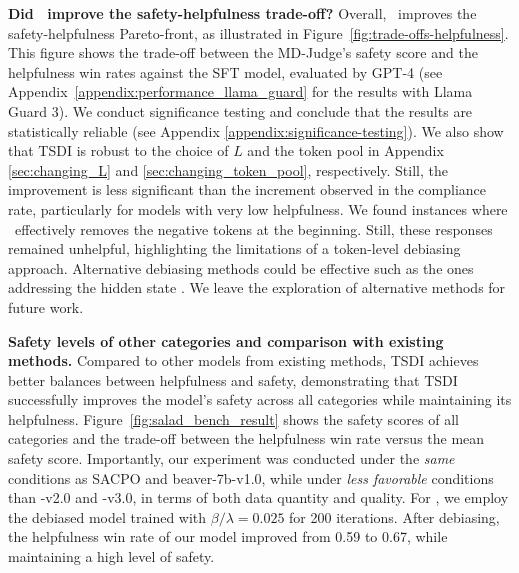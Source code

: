 \textbf{Did \algoshort~improve the safety-helpfulness trade-off?} Overall, \algoshort~improves the safety-helpfulness Pareto-front, as illustrated in Figure~\ref{fig:trade-offs-helpfulness}. This figure shows the trade-off between the MD-Judge's safety score and the helpfulness win rates against the SFT model, evaluated by GPT-4 (see Appendix~\ref{appendix:performance_llama_guard} for the results with Llama Guard 3). We conduct significance testing and conclude that the results are statistically reliable (see Appendix \ref{appendix:significance-testing}). We also show that TSDI is robust to the choice of $L$ and the token pool in Appendix \ref{sec:changing_L} and \ref{sec:changing_token_pool}, respectively. Still, the improvement is less significant than the increment observed in the compliance rate, particularly for models with very low helpfulness. We found instances where \algoshort~effectively removes the negative tokens at the beginning. Still, these responses remained unhelpful, highlighting the limitations of a token-level debiasing approach. Alternative debiasing methods could be effective such as the ones addressing the hidden state \cite{li2024rethinkingjailbreaking,xu2024uncoveringsafety,zou2024improving}.
We leave the exploration of alternative methods for future work.

\textbf{Safety levels of other categories and comparison with existing methods.} Compared to other models from existing methods, TSDI achieves better balances between helpfulness and safety, demonstrating that TSDI successfully improves the model's safety across all categories while maintaining its helpfulness. Figure~\ref{fig:salad_bench_result} shows the safety scores of all categories and the trade-off between the helpfulness win rate versus the mean safety score. Importantly, our experiment was conducted under the \textit{same} conditions as SACPO and beaver-7b-v1.0, while under \textit{less favorable} conditions than -v2.0 and -v3.0, in terms of both data quantity and quality. For \algoshort, we employ the debiased model trained with $\beta/\lambda = 0.025$ for 200 iterations. After debiasing, the helpfulness win rate of our model improved from 0.59 to 0.67, while maintaining a high level of safety.
